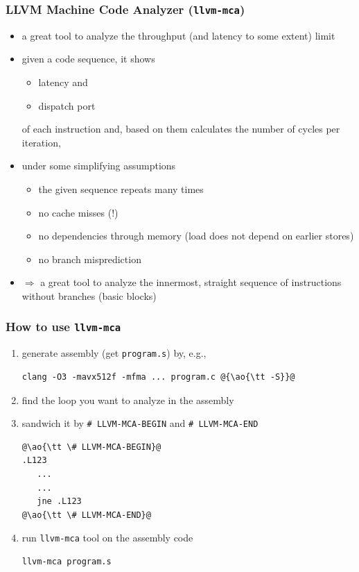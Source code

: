\documentclass[12pt,dvipdfmx]{beamer}
\newcommand{\ao}[1]{{\color{blue}#1}}
\begin{document}
\begin{frame}[fragile]
\frametitle{LLVM Machine Code Analyzer ({\tt llvm-mca})}

\begin{itemize}
\item a great tool to analyze
  the throughput (and latency to some extent) limit

\item given a code sequence, it shows
  \begin{itemize}
  \item \ao{latency} and
  \item \ao{dispatch port}
  \end{itemize}
  of each instruction and, based on them \ao{calculates
  the number of cycles per iteration},
\item under some simplifying assumptions
  \begin{itemize}
  \item the given sequence repeats many times
  \item no cache misses (!)
  \item no dependencies through memory (load does not depend on earlier stores)
  \item no branch misprediction
  \end{itemize}

\item $\Rightarrow$ a great tool to analyze the innermost, straight sequence of
  instructions without branches (basic blocks)
\end{itemize}
\end{frame}

\begin{frame}[fragile]
\frametitle{How to use {\tt llvm-mca}}
\begin{enumerate}
\item generate assembly (get {\tt program.s}) by, e.g.,
\begin{lstlisting}
clang -O3 -mavx512f -mfma ... program.c @{\ao{\tt -S}}@
\end{lstlisting}      
\item find the loop 
  you want to analyze in the assembly

\item sandwich it by \ao{\tt \# LLVM-MCA-BEGIN} and \ao{\tt \# LLVM-MCA-END}
\begin{lstlisting}
@\ao{\tt \# LLVM-MCA-BEGIN}@
.L123
   ...
   ...
   jne .L123
@\ao{\tt \# LLVM-MCA-END}@
\end{lstlisting}
\item run {\tt llvm-mca} tool on the assembly code
\begin{lstlisting}
llvm-mca program.s    
\end{lstlisting}
\end{enumerate}
\end{frame}
\end{document}
